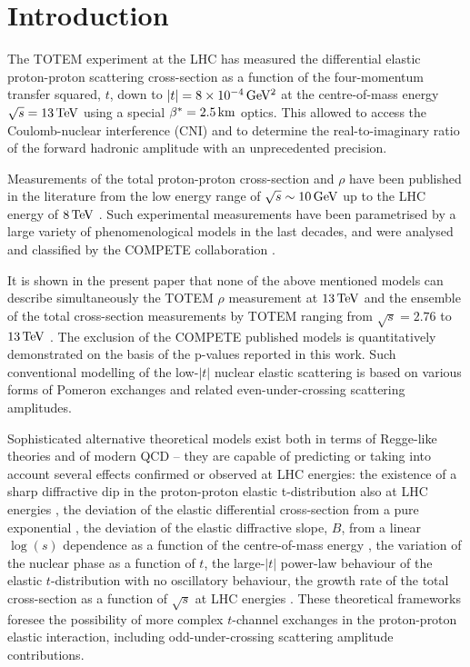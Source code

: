 \section{Introduction}
\label{sec:introduction}

The TOTEM experiment at the LHC has measured the differential elastic proton-proton scattering cross-section as a function of the four-momentum transfer squared, $t$, down to $|t| = 8\times10^{-4}\,{\rm GeV^2}$ at the centre-of-mass energy $\sqrt s = 13\,{\rm TeV}$ using a special $\beta^* = 2.5\,{\rm km}$ optics. This allowed to access the Coulomb-nuclear interference (CNI) and to determine the real-to-imaginary ratio of the forward hadronic amplitude with an unprecedented precision.

Measurements of the total proton-proton cross-section and $\rho$ have been published in the literature from the low energy range of $\sqrt s \sim 10\,{\rm GeV}$ up to the LHC energy of $8\,{\rm TeV}$ \cite{pdg-2016}. Such experimental measurements have been parametrised by a large variety of phenomenological models in the last decades, and were analysed and classified by the COMPETE collaboration \cite{compete}.

It is shown in the present paper that none of the above mentioned models can describe simultaneously the TOTEM $\rho$ measurement at $13\,{\rm TeV}$ and the ensemble of the total cross-section measurements by TOTEM ranging from $\sqrt s = 2.76$ to $13\,{\rm TeV}$ \cite{totem-7tev-tot2,totem-8tev-90m,totem-8tev-1km,totem-13tev-90m}. The exclusion of the COMPETE published models is quantitatively demonstrated on the basis of the p-values reported in this work. Such conventional modelling of the low-$|t|$ nuclear elastic scattering is based on various forms of Pomeron exchanges and related even-under-crossing scattering amplitudes.

Sophisticated alternative theoretical models exist both in terms of Regge-like theories \cite{nicolescu-1992} and of modern QCD \cite{braun} -- they are capable of predicting or taking into account several effects confirmed or observed at LHC energies: the existence of a sharp diffractive dip in the proton-proton elastic t-distribution also at LHC energies \cite{totem-7tev-first}, the deviation of the elastic differential cross-section from a pure exponential \cite{totem-8tev-90m}, the deviation of the elastic diffractive slope, $B$, from a linear $\log(s)$ dependence as a function of the centre-of-mass energy \cite{totem-13tev-90m}, the variation of the nuclear phase as a function of $t$, the large-$|t|$ power-law behaviour of the elastic $t$-distribution with no oscillatory behaviour, the growth rate of the total cross-section as a function of $\sqrt s$ at LHC energies \cite{totem-13tev-90m}. These theoretical frameworks foresee the possibility of more complex $t$-channel exchanges in the proton-proton elastic interaction, including odd-under-crossing scattering amplitude contributions.

